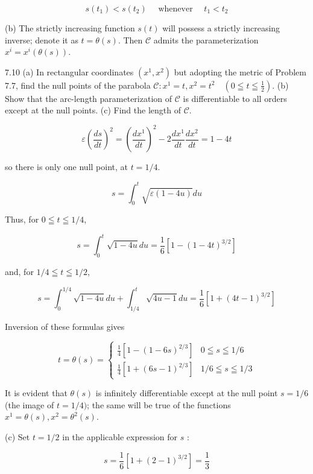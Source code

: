 \documentclass[10pt]{article}
\begin{document}
$$
s\left(t_{1}\right)<s\left(t_{2}\right) \quad \text { whenever } \quad t_{1}<t_{2}
$$

(b) The strictly increasing function $s(t)$ will possess a strictly increasing inverse; denote it as $t=\theta(s)$. Then $\mathscr{C}$ admits the parameterization $x^{i}=x^{i}(\theta(s))$.

7.10 (a) In rectangular coordinates $\left(x^{1}, x^{2}\right)$ but adopting the metric of Problem 7.7, find the null points of the parabola $\mathscr{C}: x^{1}=t, x^{2}=t^{2} \quad\left(0 \leqq t \leqq \frac{1}{2}\right)$. (b) Show that the arc-length parameterization of $\mathscr{C}$ is differentiable to all orders except at the null points. (c) Find the length of $\mathscr{C}$.


\begin{equation*}
\varepsilon\left(\frac{d s}{d t}\right)^{2}=\left(\frac{d x^{1}}{d t}\right)^{2}-2 \frac{d x^{1}}{d t} \frac{d x^{2}}{d t}=1-4 t \tag{a}
\end{equation*}


so there is only one null point, at $t=1 / 4$.


\begin{equation*}
s=\int_{0}^{t} \sqrt{\varepsilon(1-4 u)} d u \tag{b}
\end{equation*}


Thus, for $0 \leqq t \leqq 1 / 4$,

$$
s=\int_{0}^{t} \sqrt{1-4 u} d u=\frac{1}{6}\left[1-(1-4 t)^{3 / 2}\right]
$$

and, for $1 / 4 \leqq t \leqq 1 / 2$,

$$
s=\int_{0}^{1 / 4} \sqrt{1-4 u} d u+\int_{1 / 4}^{t} \sqrt{4 u-1} d u=\frac{1}{6}\left[1+(4 t-1)^{3 / 2}\right]
$$

Inversion of these formulas gives

\[
t=\theta(s)=\left\{\begin{array}{lr}
\frac{1}{4}\left[1-(1-6 s)^{2 / 3}\right] & 0 \leqq s \leqq 1 / 6  \tag{1}\\
\frac{1}{4}\left[1+(6 s-1)^{2 / 3}\right] & 1 / 6 \leqq s \leqq 1 / 3
\end{array}\right.
\]

It is evident that $\theta(s)$ is infinitely differentiable except at the null point $s=1 / 6$ (the image of $t=1 / 4)$; the same will be true of the functions $x^{1}=\theta(s), x^{2}=\theta^{2}(s)$.

(c) Set $t=1 / 2$ in the applicable expression for $s$ :

$$
s=\frac{1}{6}\left[1+(2-1)^{3 / 2}\right]=\frac{1}{3}
$$
\end{document}
